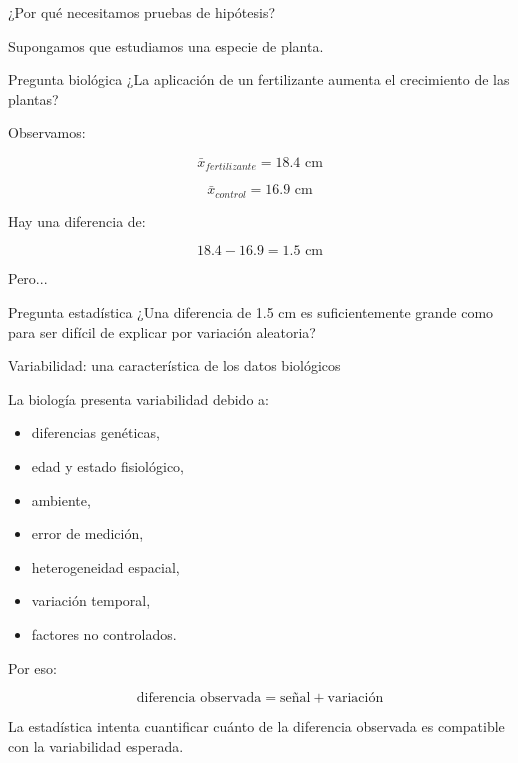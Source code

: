 \documentclass[aspectratio=169,11pt]{beamer}
\begin{document}
\begin{frame}{¿Por qué necesitamos pruebas de hipótesis?}

Supongamos que estudiamos una especie de planta.

\begin{block}{Pregunta biológica}
¿La aplicación de un fertilizante aumenta el crecimiento de las plantas?
\end{block}

Observamos:

\[
\bar{x}_{fertilizante}=18.4\text{ cm}
\]

\[
\bar{x}_{control}=16.9\text{ cm}
\]

Hay una diferencia de:

\[
18.4-16.9=1.5\text{ cm}
\]

\pause

Pero...

\begin{alertblock}{Pregunta estadística}
¿Una diferencia de 1.5 cm es suficientemente grande como para ser difícil
de explicar por variación aleatoria?
\end{alertblock}

\end{frame}

\begin{frame}{Variabilidad: una característica de los datos biológicos}

La biología presenta variabilidad debido a:

\begin{itemize}
    \item diferencias genéticas,
    \item edad y estado fisiológico,
    \item ambiente,
    \item error de medición,
    \item heterogeneidad espacial,
    \item variación temporal,
    \item factores no controlados.
\end{itemize}

\vspace{0.3cm}

Por eso:

\[
\text{diferencia observada}
=
\text{señal}
+
\text{variación}
\]

\pause

La estadística intenta cuantificar cuánto de la diferencia observada
es compatible con la variabilidad esperada.

\end{frame}
\end{document}
